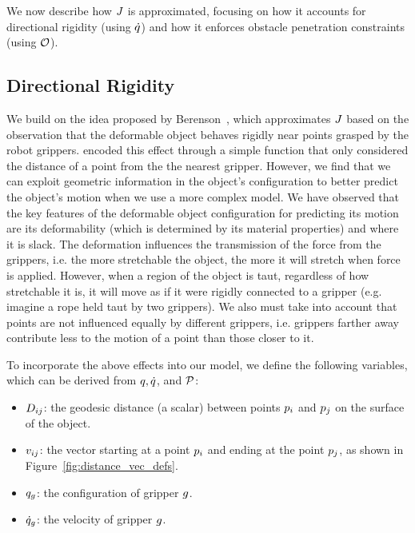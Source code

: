 We now describe how $J$ is approximated, focusing on how it accounts for directional rigidity (using $\dot{q}$) and how it enforces obstacle penetration constraints (using $\mathcal{O}$).

\subsection{Directional Rigidity}

We build on the idea proposed by Berenson~\cite{Berenson2013}, which approximates $J$ based on the observation that the deformable object behaves rigidly near points grasped by the robot grippers. \cite{Berenson2013} encoded this effect through a simple function that only considered the distance of a point from the the nearest gripper. However, we find that we can exploit geometric information in the object's configuration to better predict the object's motion when we use a more complex model. We have observed that the key features of the deformable object configuration for predicting its motion are its deformability (which is determined by its material properties) and where it is slack. The deformation influences the transmission of the force from the grippers, i.e. the more stretchable the object, the more it will stretch when force is applied. However, when a region of the object is taut, regardless of how stretchable it is, it will move as if it were rigidly connected to a gripper (e.g. imagine a rope held taut by two grippers). We also must take into account that points are not influenced equally by different grippers, i.e. grippers farther away contribute less to the motion of a point than those closer to it.

To incorporate the above effects into our model, we define the following variables, which can be derived from $q, \dot{q}$, and $\mathcal{P}$:
\begin{itemize}
    \item $D_{i j}$: the geodesic distance (a scalar) between points $p_i$ and $p_j$ on the surface of the object.
    \item $v_{i j}$: the vector starting at a point $p_i$ and ending at the point $p_j$, as shown in Figure~\ref{fig:distance_vec_defs}.
    \item $q_g$: the configuration of gripper $g$.
    \item $\dot{q}_g$: the velocity of gripper $g$.
\end{itemize}

